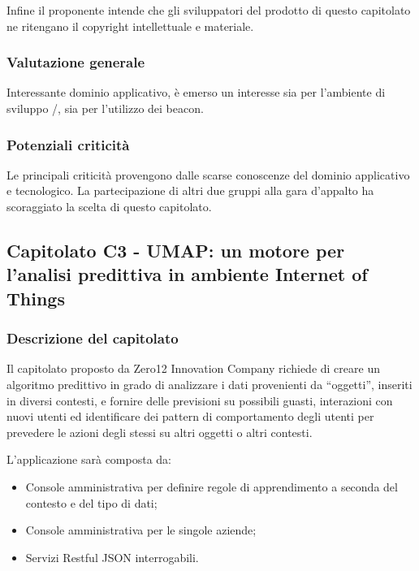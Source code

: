 \documentclass[a4paper, titlepage]{article}
\begin{document}
Infine il proponente intende che gli sviluppatori del prodotto di questo capitolato ne ritengano il copyright intellettuale e materiale.

\subsubsection{Valutazione generale}

Interessante dominio applicativo, è emerso un interesse sia per l'ambiente di sviluppo /, sia per l'utilizzo dei beacon.

\subsubsection{Potenziali criticità}

Le principali criticità provengono dalle scarse conoscenze del dominio applicativo e tecnologico.
La partecipazione di altri due gruppi alla gara d'appalto ha scoraggiato la scelta di questo capitolato.

\newpage

\subsection{Capitolato C3 - UMAP: un motore per l'analisi predittiva in ambiente Internet of Things}

\subsubsection{Descrizione del capitolato}
Il capitolato proposto da Zero12 Innovation Company richiede di creare un algoritmo predittivo in grado di analizzare i dati provenienti da “oggetti”, inseriti in diversi contesti, e fornire delle previsioni su possibili guasti, interazioni con nuovi utenti ed identificare dei pattern di comportamento degli utenti per prevedere le azioni degli stessi su altri oggetti o altri contesti.

L'applicazione  sarà composta da:
\begin{itemize}
	\item Console  amministrativa per definire regole di apprendimento a seconda del contesto e del tipo di dati;
	\item Console  amministrativa per le singole aziende;
	\item Servizi  Restful JSON interrogabili.
\end{itemize}
\end{document}
